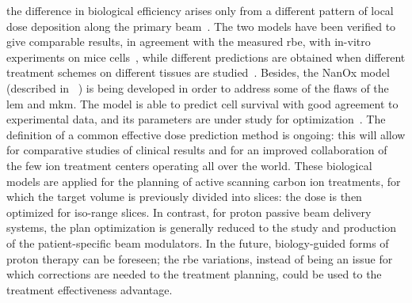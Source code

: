 the difference in biological efficiency arises only from a different pattern of local dose deposition along the primary beam~\parencite{Kramer2000, Jakel2001a}.
The two models have been verified to give comparable results, in agreement with the measured \gls{rbe}, with in-vitro experiments on mice cells~\parencite{Uzawa2009}, while different predictions are obtained when different treatment schemes on different tissues are studied~\parencite{Fossati2012, Steinstrater2012}. Besides, the NanOx model (described in ~\cite{Cunha2017}) is being developed in order to address some of the flaws of the \gls{lem} and \gls{mkm}. The model is able to predict cell survival with good agreement to experimental data, and its parameters are under study for optimization~\parencite{Monini2018}. The definition of a common effective dose prediction method is ongoing: this will allow for comparative studies of clinical results and for an improved collaboration of the few ion treatment centers operating all over the world.
These biological models are applied for the planning of active scanning carbon ion treatments, for which the target volume is previously divided into slices: the dose is then optimized for iso-range slices. In contrast, for proton passive beam delivery systems, the plan optimization is generally reduced to the study and production of the patient-specific beam modulators. 
In the future, biology-guided forms of proton therapy can be foreseen; the \gls{rbe} variations, instead of being an issue for which corrections are needed to the treatment planning, could be used to the treatment effectiveness advantage.  

